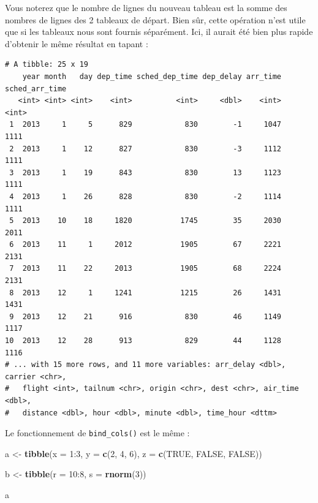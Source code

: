 \documentclass[a4paperpaper,]{article}
\newenvironment{Shaded}{\begin{snugshade}}{\end{snugshade}}
\newcommand{\DataTypeTok}[1]{\textcolor[rgb]{0.00,0.34,0.68}{#1}}
\newcommand{\DecValTok}[1]{\textcolor[rgb]{0.69,0.50,0.00}{#1}}
\newcommand{\KeywordTok}[1]{\textcolor[rgb]{0.12,0.11,0.11}{\textbf{#1}}}
\newcommand{\NormalTok}[1]{\textcolor[rgb]{0.12,0.11,0.11}{#1}}
\newcommand{\OperatorTok}[1]{\textcolor[rgb]{0.12,0.11,0.11}{#1}}
\newcommand{\OtherTok}[1]{\textcolor[rgb]{0.00,0.43,0.16}{#1}}
\newcommand{\StringTok}[1]{\textcolor[rgb]{0.75,0.01,0.01}{#1}}
\theoremstyle{definition}
\theoremstyle{definition}
\theoremstyle{definition}
\theoremstyle{remark}
\begin{document}
Vous noterez que le nombre de lignes du nouveau tableau est la somme des
nombres de lignes des 2 tableaux de départ. Bien sûr, cette opération
n'est utile que si les tableaux nous sont fournis séparément. Ici, il
aurait été bien plus rapide d'obtenir le même résultat en tapant :

\begin{Shaded}
\end{Shaded}

\begin{verbatim}
# A tibble: 25 x 19
    year month   day dep_time sched_dep_time dep_delay arr_time sched_arr_time
   <int> <int> <int>    <int>          <int>     <dbl>    <int>          <int>
 1  2013     1     5      829            830        -1     1047           1111
 2  2013     1    12      827            830        -3     1112           1111
 3  2013     1    19      843            830        13     1123           1111
 4  2013     1    26      828            830        -2     1114           1111
 5  2013    10    18     1820           1745        35     2030           2011
 6  2013    11     1     2012           1905        67     2221           2131
 7  2013    11    22     2013           1905        68     2224           2131
 8  2013    12     1     1241           1215        26     1431           1431
 9  2013    12    21      916            830        46     1149           1117
10  2013    12    28      913            829        44     1128           1116
# ... with 15 more rows, and 11 more variables: arr_delay <dbl>, carrier <chr>,
#   flight <int>, tailnum <chr>, origin <chr>, dest <chr>, air_time <dbl>,
#   distance <dbl>, hour <dbl>, minute <dbl>, time_hour <dttm>
\end{verbatim}

Le fonctionnement de \texttt{bind\_cols()} est le même :

\begin{Shaded}
\begin{Highlighting}[]
\NormalTok{a <-}\StringTok{ }\KeywordTok{tibble}\NormalTok{(}\DataTypeTok{x =} \DecValTok{1}\OperatorTok{:}\DecValTok{3}\NormalTok{, }
            \DataTypeTok{y =} \KeywordTok{c}\NormalTok{(}\DecValTok{2}\NormalTok{, }\DecValTok{4}\NormalTok{, }\DecValTok{6}\NormalTok{),}
            \DataTypeTok{z =} \KeywordTok{c}\NormalTok{(}\OtherTok{TRUE}\NormalTok{, }\OtherTok{FALSE}\NormalTok{, }\OtherTok{FALSE}\NormalTok{))}

\NormalTok{b <-}\StringTok{ }\KeywordTok{tibble}\NormalTok{(}\DataTypeTok{r =} \DecValTok{10}\OperatorTok{:}\DecValTok{8}\NormalTok{, }
            \DataTypeTok{s =} \KeywordTok{rnorm}\NormalTok{(}\DecValTok{3}\NormalTok{))}

\NormalTok{a}
\end{Highlighting}
\end{Shaded}
\end{document}
